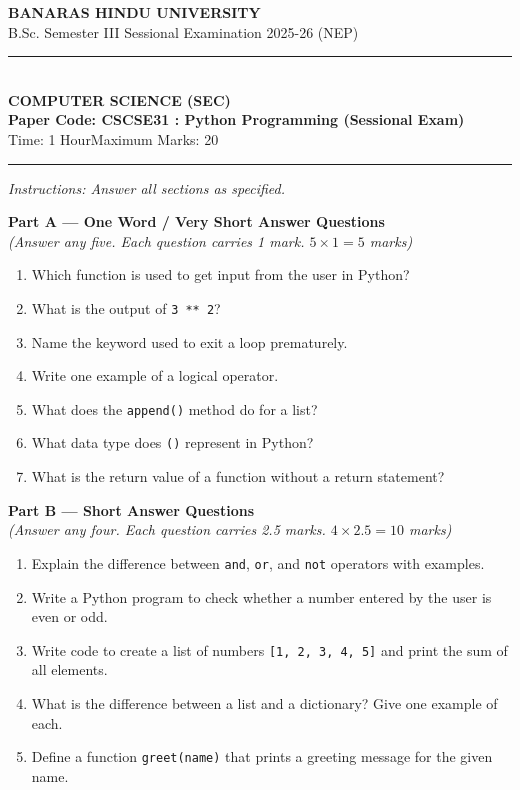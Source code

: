\documentclass[11pt,a4paper]{article}
\begin{document}
\begin{center}
  {\large\bfseries BANARAS HINDU UNIVERSITY}\\[2pt]
  {\normalsize B.Sc. Semester III Sessional Examination 2025-26 (NEP)}\\[6pt]
  \rule{0.8\linewidth}{0.5pt}\\[6pt]
  {\large\bfseries COMPUTER SCIENCE (SEC)}\\[4pt]
  {\large\bfseries Paper Code: CSCSE31 : Python Programming (Sessional Exam)}\\[4pt]
  {\normalsize Time: 1 Hour\hfill Maximum Marks: 20}
\end{center}

\rule{\linewidth}{0.4pt}

\smallskip

\noindent \textit{Instructions: Answer all sections as specified.}

\bigskip

\begin{center}
  \textbf{Part A --- One Word / Very Short Answer Questions}\\
  \textit{(Answer any five. Each question carries 1 mark. $5 \times 1 = 5$ marks)}
\end{center}
\begin{enumerate}[label=\textbf{\arabic*.}]
  \item Which function is used to get input from the user in Python?
  \item What is the output of \texttt{3 ** 2}?
  \item Name the keyword used to exit a loop prematurely.
  \item Write one example of a logical operator.
  \item What does the \texttt{append()} method do for a list?
  \item What data type does \texttt{()} represent in Python?
  \item What is the return value of a function without a return statement?
\end{enumerate}

\bigskip

\begin{center}
  \textbf{Part B --- Short Answer Questions}\\
  \textit{(Answer any four. Each question carries 2.5 marks. $4 \times 2.5 = 10$ marks)}
\end{center}
\begin{enumerate}[label=\textbf{\arabic*.}, start=8]
  \item Explain the difference between \texttt{and}, \texttt{or}, and \texttt{not} operators with examples.
  \item Write a Python program to check whether a number entered by the user is even or odd.
  \item Write code to create a list of numbers \texttt{[1, 2, 3, 4, 5]} and print the sum of all elements.
  \item What is the difference between a list and a dictionary? Give one example of each.
  \item Define a function \texttt{greet(name)} that prints a greeting message for the given name.
\end{enumerate}
\end{document}
